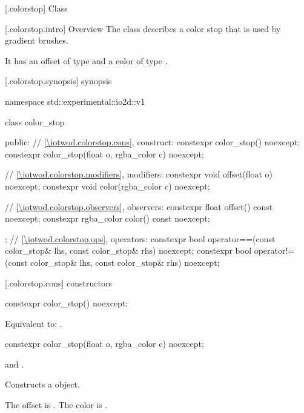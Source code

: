  [\iotwod.colorstop] {Class }

 [\iotwod.colorstop.intro] {Overview}
\pnum
{}%
The class  describes a color stop that is used by gradient brushes.

\pnum
It has an offset of type  and a color of type .

 [\iotwod.colorstop.synopsis] { synopsis}

\begin{codeblock}
namespace std::experimental::io2d::v1 {
  class color_stop {
  public:
    // \ref{\iotwod.colorstop.cons}, construct:
    constexpr color_stop() noexcept;
    constexpr color_stop(float o, rgba_color c) noexcept;
    
    // \ref{\iotwod.colorstop.modifiers}, modifiers:
    constexpr void offset(float o) noexcept;
    constexpr void color(rgba_color c) noexcept;
	
    // \ref{\iotwod.colorstop.observers}, observers:
    constexpr float offset() const noexcept;
    constexpr rgba_color color() const noexcept;
  };
  // \ref{\iotwod.colorstop.ops}, operators:
  constexpr bool operator==(const color_stop& lhs, const color_stop& rhs)
    noexcept;
  constexpr bool operator!=(const color_stop& lhs, const color_stop& rhs)
    noexcept;
}
\end{codeblock}

 [\iotwod.colorstop.cons] { constructors}

%
\begin{itemdecl}
constexpr color_stop() noexcept;
\end{itemdecl}
\begin{itemdescr}
\pnum
\effects
Equivalent to: .
\end{itemdescr}

%
\begin{itemdecl}
constexpr color_stop(float o, rgba_color c) noexcept;
\end{itemdecl}
\begin{itemdescr}
\pnum
\requires
{} and .

\pnum
\effects
Constructs a  object.

\pnum
The offset is . The color is .
\end{itemdescr}

